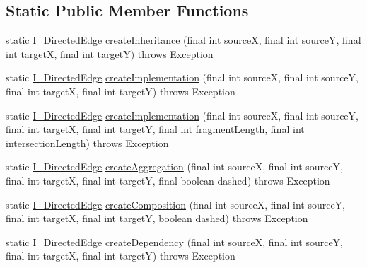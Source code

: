 \subsection*{Static Public Member Functions}
\begin{DoxyCompactItemize}
\item 
static \hyperlink{interfaceorg_1_1tzi_1_1use_1_1gui_1_1views_1_1diagrams_1_1edges_1_1_i___directed_edge}{I\-\_\-\-Directed\-Edge} \hyperlink{classorg_1_1tzi_1_1use_1_1gui_1_1views_1_1diagrams_1_1edges_1_1_directed_edge_factory_a4bd07a03d609f705066ef216ab701085}{create\-Inheritance} (final int source\-X, final int source\-Y, final int target\-X, final int target\-Y)  throws Exception 
\item 
static \hyperlink{interfaceorg_1_1tzi_1_1use_1_1gui_1_1views_1_1diagrams_1_1edges_1_1_i___directed_edge}{I\-\_\-\-Directed\-Edge} \hyperlink{classorg_1_1tzi_1_1use_1_1gui_1_1views_1_1diagrams_1_1edges_1_1_directed_edge_factory_aee9cd6e8bccc6a56174ecf372c72f435}{create\-Implementation} (final int source\-X, final int source\-Y, final int target\-X, final int target\-Y)  throws Exception 
\item 
static \hyperlink{interfaceorg_1_1tzi_1_1use_1_1gui_1_1views_1_1diagrams_1_1edges_1_1_i___directed_edge}{I\-\_\-\-Directed\-Edge} \hyperlink{classorg_1_1tzi_1_1use_1_1gui_1_1views_1_1diagrams_1_1edges_1_1_directed_edge_factory_aba2121e17352ebe249da702bef889590}{create\-Implementation} (final int source\-X, final int source\-Y, final int target\-X, final int target\-Y, final int fragment\-Length, final int intersection\-Length)  throws Exception 
\item 
static \hyperlink{interfaceorg_1_1tzi_1_1use_1_1gui_1_1views_1_1diagrams_1_1edges_1_1_i___directed_edge}{I\-\_\-\-Directed\-Edge} \hyperlink{classorg_1_1tzi_1_1use_1_1gui_1_1views_1_1diagrams_1_1edges_1_1_directed_edge_factory_a1f3ffdd8684fbb7c447cca8860e2d4b5}{create\-Aggregation} (final int source\-X, final int source\-Y, final int target\-X, final int target\-Y, final boolean dashed)  throws Exception 
\item 
static \hyperlink{interfaceorg_1_1tzi_1_1use_1_1gui_1_1views_1_1diagrams_1_1edges_1_1_i___directed_edge}{I\-\_\-\-Directed\-Edge} \hyperlink{classorg_1_1tzi_1_1use_1_1gui_1_1views_1_1diagrams_1_1edges_1_1_directed_edge_factory_a1238d31a0fb16b2545c27b54e5000d37}{create\-Composition} (final int source\-X, final int source\-Y, final int target\-X, final int target\-Y, boolean dashed)  throws Exception 
\item 
static \hyperlink{interfaceorg_1_1tzi_1_1use_1_1gui_1_1views_1_1diagrams_1_1edges_1_1_i___directed_edge}{I\-\_\-\-Directed\-Edge} \hyperlink{classorg_1_1tzi_1_1use_1_1gui_1_1views_1_1diagrams_1_1edges_1_1_directed_edge_factory_a78e921a8d9de92c8b0589392ea2181d9}{create\-Dependency} (final int source\-X, final int source\-Y, final int target\-X, final int target\-Y)  throws Exception 

\end{DoxyCompactItemize}

